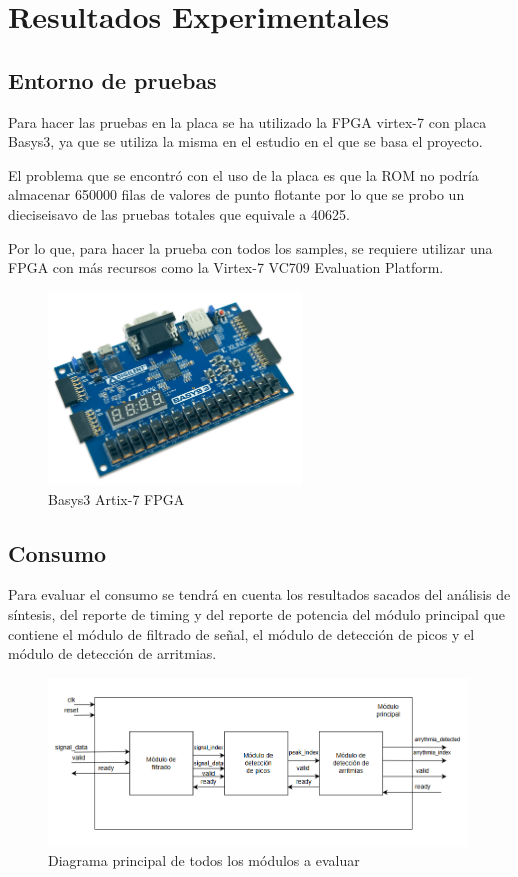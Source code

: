 \chapter{Resultados Experimentales}


\section{Entorno de pruebas}
Para hacer las pruebas en la placa se ha utilizado la FPGA virtex-7 con placa Basys3, ya que se utiliza la misma en el estudio en el que se basa el proyecto\cite{desai2021low}.

El problema que se encontró con el uso de la placa es que la ROM no podría almacenar 650000 filas de valores de punto flotante por lo que se probo un dieciseisavo de las pruebas totales que equivale a 40625.

Por lo que, para hacer la prueba con todos los samples, se requiere utilizar una FPGA con más recursos como la Virtex-7 VC709 Evaluation Platform.

\begin{figure}[h]
	\centering
	\includegraphics[width=0.6\textwidth]{./Images/img_introduccion/Basys3.jpg}
	\caption{Basys3 Artix-7 FPGA}
	\label{fig:Basys3}
\end{figure}

\section{Consumo}
	Para evaluar el consumo se tendrá en cuenta los resultados sacados del análisis de síntesis, del reporte de timing y del reporte de potencia del módulo principal que contiene el módulo de filtrado de señal,
	el módulo de detección de picos y el módulo de detección de arritmias. 
	
	\begin{figure}[h!]
		\centering
		\includegraphics[width=0.99\textwidth]{./Images/img_res_experimentales/diagramaGeneral.png}
		\caption{Diagrama principal de todos los módulos a evaluar}
		\label{fig:Diagramaasmfiltrado}
	\end{figure} 

